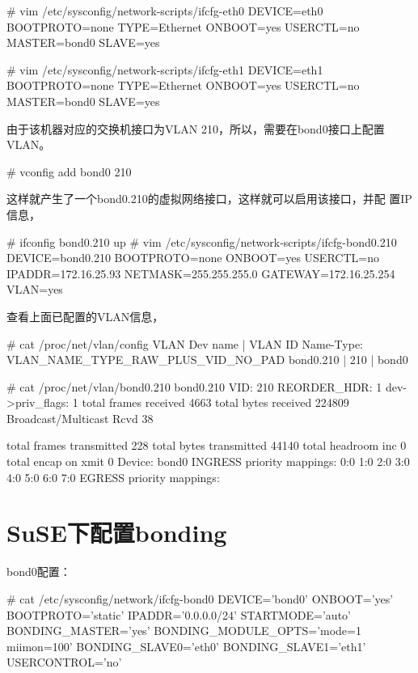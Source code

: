 \begin{code}
# vim /etc/sysconfig/network-scripts/ifcfg-eth0
DEVICE=eth0
BOOTPROTO=none
TYPE=Ethernet
ONBOOT=yes
USERCTL=no
MASTER=bond0 
SLAVE=yes

# vim /etc/sysconfig/network-scripts/ifcfg-eth1
DEVICE=eth1
BOOTPROTO=none
TYPE=Ethernet
ONBOOT=yes
USERCTL=no
MASTER=bond0 
SLAVE=yes
\end{code}

由于该机器对应的交换机接口为VLAN 210，所以，需要在bond0接口上配置VLAN。

\begin{code}
# vconfig add bond0 210
\end{code}

这样就产生了一个bond0.210的虚拟网络接口，这样就可以启用该接口，并配
置IP信息，

\begin{code}
# ifconfig bond0.210 up
# vim /etc/sysconfig/network-scripts/ifcfg-bond0.210
DEVICE=bond0.210
BOOTPROTO=none
ONBOOT=yes
USERCTL=no
IPADDR=172.16.25.93
NETMASK=255.255.255.0
GATEWAY=172.16.25.254
VLAN=yes
\end{code}

查看上面已配置的VLAN信息，

\begin{code}
# cat /proc/net/vlan/config
VLAN Dev name	 | VLAN ID
Name-Type: VLAN_NAME_TYPE_RAW_PLUS_VID_NO_PAD
bond0.210      | 210  | bond0

# cat /proc/net/vlan/bond0.210 
bond0.210  VID: 210	 REORDER_HDR: 1  dev->priv_flags: 1
         total frames received         4663
          total bytes received       224809
      Broadcast/Multicast Rcvd          38

      total frames transmitted          228
       total bytes transmitted         44140
            total headroom inc           0
           total encap on xmit            0
Device: bond0
INGRESS priority mappings: 0:0  1:0  2:0  3:0  4:0  5:0  6:0 7:0
EGRESS priority mappings:
\end{code}

\section{SuSE下配置bonding}

bond0配置：

\begin{code}
# cat /etc/sysconfig/network/ifcfg-bond0
DEVICE='bond0'
ONBOOT='yes'
BOOTPROTO='static'
IPADDR='0.0.0.0/24'   
STARTMODE='auto'
BONDING_MASTER='yes'
BONDING_MODULE_OPTS='mode=1 miimon=100'
BONDING_SLAVE0='eth0'
BONDING_SLAVE1='eth1'
USERCONTROL='no'
\end{code}

